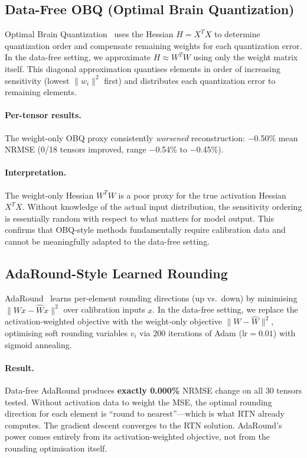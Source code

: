 \documentclass{article}
\begin{document}
\subsection{Data-Free OBQ (Optimal Brain Quantization)}

Optimal Brain Quantization~\cite{frantar2023gptq} uses the Hessian $H = X^T X$ to determine quantization order and compensate remaining weights for each quantization error. In the data-free setting, we approximate $H \approx W^T W$ using only the weight matrix itself. This diagonal approximation quantises elements in order of increasing sensitivity (lowest $\|w_i\|^2$ first) and distributes each quantization error to remaining elements.

\paragraph{Per-tensor results.} The weight-only OBQ proxy consistently \emph{worsened} reconstruction: $-$0.50\% mean NRMSE (0/18 tensors improved, range $-$0.54\% to $-$0.45\%).

\paragraph{Interpretation.} The weight-only Hessian $W^T W$ is a poor proxy for the true activation Hessian $X^T X$. Without knowledge of the actual input distribution, the sensitivity ordering is essentially random with respect to what matters for model output. This confirms that OBQ-style methods fundamentally require calibration data and cannot be meaningfully adapted to the data-free setting.

\subsection{AdaRound-Style Learned Rounding}

AdaRound~\cite{nagel2020adaround} learns per-element rounding directions (up vs.\ down) by minimising $\|Wx - \hat{W}x\|^2$ over calibration inputs $x$. In the data-free setting, we replace the activation-weighted objective with the weight-only objective $\|W - \hat{W}\|^2$, optimising soft rounding variables $v_i$ via 200 iterations of Adam ($\text{lr}=0.01$) with sigmoid annealing.

\paragraph{Result.} Data-free AdaRound produces \textbf{exactly 0.000\%} NRMSE change on all 30 tensors tested. Without activation data to weight the MSE, the optimal rounding direction for each element is ``round to nearest''---which is what RTN already computes. The gradient descent converges to the RTN solution. AdaRound's power comes entirely from its activation-weighted objective, not from the rounding optimisation itself.
\end{document}
